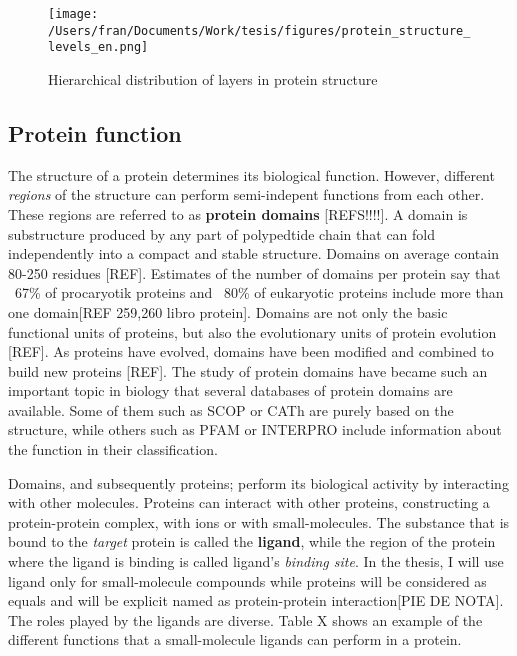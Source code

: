 \documentclass[12pt, a4paper,twoside]{tesi_upf}
\begin{document}
\pagebreak
\begin{figure}[h]

  \centering
  	\texttt{[image: /Users/fran/Documents/Work/tesis/figures/protein\_structure\_levels\_en.png]}

	\caption{Hierarchical distribution of layers in protein structure}
	\label{fig:hierarchy_figure}
\end{figure}

\subsection{Protein function}

\par The structure of a protein determines its biological function. However, different \textit{regions} of the structure can perform semi-indepent functions from each other. These regions are referred to as \textbf{protein domains} [REFS!!!!]. A domain is substructure produced by any part of polypedtide chain that can fold independently into a compact and stable structure. Domains on average contain 80-250 residues [REF]. Estimates of the number of domains per protein say that  ~67\% of procaryotik proteins and ~80\% of eukaryotic proteins include more than one domain[REF 259,260 libro protein]. Domains are not only the basic functional units of proteins, but also the evolutionary units of protein evolution [REF]. As proteins have evolved, domains have been modified and combined to build new proteins [REF]. The study of protein domains have became such an important topic in biology  that several databases of protein domains are available. Some of them such as SCOP or CATh are purely based on the structure, while others such as PFAM or INTERPRO include information about the function in their classification. 
\par Domains, and subsequently proteins; perform its biological activity by interacting with other molecules. Proteins can interact with other proteins, constructing a protein-protein complex, with ions or with small-molecules. The substance that is bound to the \textit{target} protein is called the \textbf{ligand}, while the region of the protein where the ligand is binding is called ligand's \textit{binding site}. In the thesis, I will use ligand only for small-molecule compounds while proteins will be considered as equals and will be explicit named as protein-protein interaction[PIE DE NOTA].  The roles played by the ligands are diverse. Table X shows an example of the different functions that a small-molecule ligands can perform in a protein. 
\end{document}
